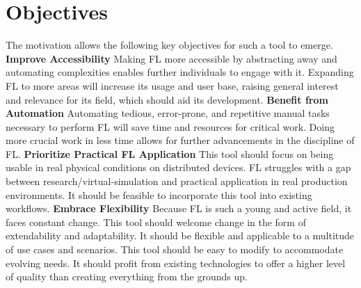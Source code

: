 \section{Objectives}\label{section:objectives}

The motivation allows the following key objectives for such a tool to emerge.
\vspace{5mm}
\newline
\textbf{Improve Accessibility}\newline
Making FL more accessible by abstracting away and automating complexities enables further individuals to engage with it.
Expanding FL to more areas will increase its usage and user base, raising general interest and relevance for its field, which should aid its development.
\vspace{5mm}
\newline
\textbf{Benefit from Automation}\newline
Automating tedious, error-prone, and repetitive manual tasks necessary to perform FL will save time and resources for critical work.
Doing more crucial work in less time allows for further advancements in the discipline of FL.
\vspace{5mm}
\newline
\textbf{Prioritize Practical FL Application}\newline
This tool should focus on being usable in real physical conditions on distributed devices.
FL struggles with a gap between research/virtual-simulation and practical application in real production environments.
It should be feasible to incorporate this tool into existing workflows.
\vspace{5mm}
\newline
\textbf{Embrace Flexibility}\newline
Because FL is such a young and active field, it faces constant change.
This tool should welcome change in the form of extendability and adaptability.
It should be flexible and applicable to a multitude of use cases and scenarios.
This tool should be easy to modify to accommodate evolving needs.
It should profit from existing technologies to offer a higher level of quality than creating everything from the grounds up.
